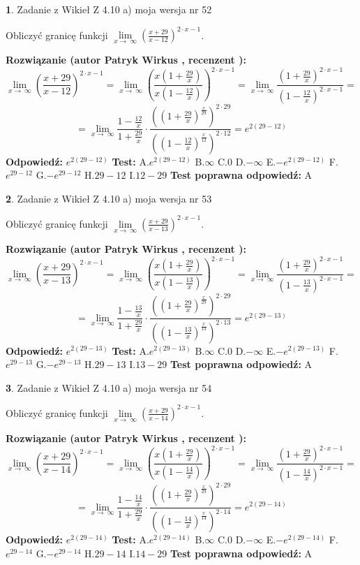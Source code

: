 \documentclass[12pt, a4paper]{article}
\theoremstyle{definition} %
\newtheorem{zad}{}
\newcommand{\zadStart}[1]{\begin{zad}#1\newline}
\newcommand{\zadStop}{\end{zad}}
\newcommand{\rozwStart}[2]{\noindent \textbf{Rozwiązanie (autor #1 , recenzent #2): }\newline}
\newcommand{\rozwStop}{\newline}
\newcommand{\odpStart}{\noindent \textbf{Odpowiedź:}\newline}
\newcommand{\odpStop}{\newline}
\newcommand{\testStart}{\noindent \textbf{Test:}\newline}
\newcommand{\testStop}{\newline}
\newcommand{\kluczStart}{\noindent \textbf{Test poprawna odpowiedź:}\newline}
\newcommand{\kluczStop}{\newline}
\begin{document}
\zadStart{Zadanie z Wikieł Z 4.10 a) moja wersja nr 52}


Obliczyć granicę funkcji  $\lim\limits_{x\to\ \infty}(\frac{x+29}{x-12})^{2\cdot x-1}$.
\zadStop
\rozwStart{Patryk Wirkus}{}
$$\lim\limits_{x\to\ \infty}(\frac{x+29}{x-12})^{2\cdot x-1} = \lim\limits_{x\to\ \infty}(\frac{x(1+\frac{29}{x})}{x(1-\frac{12}{x})})^{2\cdot x-1}=\lim\limits_{x\to\ \infty}\frac{(1+\frac{29}{x})^{2\cdot x-1}}{(1-\frac{12}{x})^{2\cdot x-1}}=$$
$$=\lim\limits_{x\to\ \infty}\frac{1-\frac{12}{x}}{1+\frac{29}{x}}\cdot\frac{((1+\frac{29}{x})^{\frac{x}{29}})^{2\cdot29}}{((1-\frac{12}{x})^{\frac{x}{12}})^{2\cdot12}}=e^{2(29-12)}$$
\rozwStop
\odpStart
$e^{2(29-12)}$
\odpStop
\testStart
A.$e^{2(29-12)}$ B.$\infty$ C.$0$ D.$-\infty$ E.$-e^{2(29-12)}$
F.$e^{29-12}$ G.$-e^{29-12}$
H.$29-12$
I.$12-29$
\testStop
\kluczStart
A
\kluczStop



\zadStart{Zadanie z Wikieł Z 4.10 a) moja wersja nr 53}


Obliczyć granicę funkcji  $\lim\limits_{x\to\ \infty}(\frac{x+29}{x-13})^{2\cdot x-1}$.
\zadStop
\rozwStart{Patryk Wirkus}{}
$$\lim\limits_{x\to\ \infty}(\frac{x+29}{x-13})^{2\cdot x-1} = \lim\limits_{x\to\ \infty}(\frac{x(1+\frac{29}{x})}{x(1-\frac{13}{x})})^{2\cdot x-1}=\lim\limits_{x\to\ \infty}\frac{(1+\frac{29}{x})^{2\cdot x-1}}{(1-\frac{13}{x})^{2\cdot x-1}}=$$
$$=\lim\limits_{x\to\ \infty}\frac{1-\frac{13}{x}}{1+\frac{29}{x}}\cdot\frac{((1+\frac{29}{x})^{\frac{x}{29}})^{2\cdot29}}{((1-\frac{13}{x})^{\frac{x}{13}})^{2\cdot13}}=e^{2(29-13)}$$
\rozwStop
\odpStart
$e^{2(29-13)}$
\odpStop
\testStart
A.$e^{2(29-13)}$ B.$\infty$ C.$0$ D.$-\infty$ E.$-e^{2(29-13)}$
F.$e^{29-13}$ G.$-e^{29-13}$
H.$29-13$
I.$13-29$
\testStop
\kluczStart
A
\kluczStop



\zadStart{Zadanie z Wikieł Z 4.10 a) moja wersja nr 54}


Obliczyć granicę funkcji  $\lim\limits_{x\to\ \infty}(\frac{x+29}{x-14})^{2\cdot x-1}$.
\zadStop
\rozwStart{Patryk Wirkus}{}
$$\lim\limits_{x\to\ \infty}(\frac{x+29}{x-14})^{2\cdot x-1} = \lim\limits_{x\to\ \infty}(\frac{x(1+\frac{29}{x})}{x(1-\frac{14}{x})})^{2\cdot x-1}=\lim\limits_{x\to\ \infty}\frac{(1+\frac{29}{x})^{2\cdot x-1}}{(1-\frac{14}{x})^{2\cdot x-1}}=$$
$$=\lim\limits_{x\to\ \infty}\frac{1-\frac{14}{x}}{1+\frac{29}{x}}\cdot\frac{((1+\frac{29}{x})^{\frac{x}{29}})^{2\cdot29}}{((1-\frac{14}{x})^{\frac{x}{14}})^{2\cdot14}}=e^{2(29-14)}$$
\rozwStop
\odpStart
$e^{2(29-14)}$
\odpStop
\testStart
A.$e^{2(29-14)}$ B.$\infty$ C.$0$ D.$-\infty$ E.$-e^{2(29-14)}$
F.$e^{29-14}$ G.$-e^{29-14}$
H.$29-14$
I.$14-29$
\testStop
\kluczStart
A
\kluczStop
\end{document}
